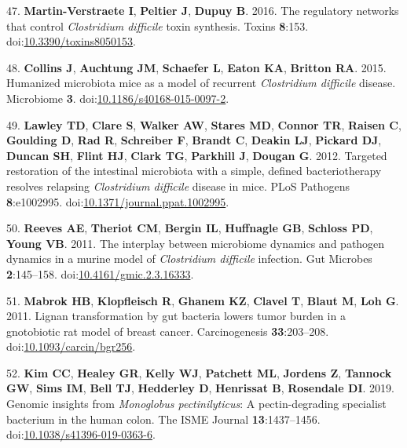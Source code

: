 \documentclass[
  12pt,
]{article}
\newenvironment{cslreferences}%
  {}%
  {\par}
\begin{document}
\begin{cslreferences}
\leavevmode\hypertarget{ref-MartinVerstraete2016}{}%
47. \textbf{Martin-Verstraete I}, \textbf{Peltier J}, \textbf{Dupuy B}.
2016. The regulatory networks that control \emph{Clostridium difficile}
toxin synthesis. Toxins \textbf{8}:153.
doi:\href{https://doi.org/10.3390/toxins8050153}{10.3390/toxins8050153}.

\leavevmode\hypertarget{ref-Collins2015}{}%
48. \textbf{Collins J}, \textbf{Auchtung JM}, \textbf{Schaefer L},
\textbf{Eaton KA}, \textbf{Britton RA}. 2015. Humanized microbiota mice
as a model of recurrent \emph{Clostridium difficile} disease. Microbiome
\textbf{3}.
doi:\href{https://doi.org/10.1186/s40168-015-0097-2}{10.1186/s40168-015-0097-2}.

\leavevmode\hypertarget{ref-Lawley2012}{}%
49. \textbf{Lawley TD}, \textbf{Clare S}, \textbf{Walker AW},
\textbf{Stares MD}, \textbf{Connor TR}, \textbf{Raisen C},
\textbf{Goulding D}, \textbf{Rad R}, \textbf{Schreiber F},
\textbf{Brandt C}, \textbf{Deakin LJ}, \textbf{Pickard DJ},
\textbf{Duncan SH}, \textbf{Flint HJ}, \textbf{Clark TG},
\textbf{Parkhill J}, \textbf{Dougan G}. 2012. Targeted restoration of
the intestinal microbiota with a simple, defined bacteriotherapy
resolves relapsing \emph{Clostridium difficile} disease in mice. PLoS
Pathogens \textbf{8}:e1002995.
doi:\href{https://doi.org/10.1371/journal.ppat.1002995}{10.1371/journal.ppat.1002995}.

\leavevmode\hypertarget{ref-Reeves2011}{}%
50. \textbf{Reeves AE}, \textbf{Theriot CM}, \textbf{Bergin IL},
\textbf{Huffnagle GB}, \textbf{Schloss PD}, \textbf{Young VB}. 2011. The
interplay between microbiome dynamics and pathogen dynamics in a murine
model of \emph{Clostridium difficile} infection. Gut Microbes
\textbf{2}:145--158.
doi:\href{https://doi.org/10.4161/gmic.2.3.16333}{10.4161/gmic.2.3.16333}.

\leavevmode\hypertarget{ref-Mabrok2011}{}%
51. \textbf{Mabrok HB}, \textbf{Klopfleisch R}, \textbf{Ghanem KZ},
\textbf{Clavel T}, \textbf{Blaut M}, \textbf{Loh G}. 2011. Lignan
transformation by gut bacteria lowers tumor burden in a gnotobiotic rat
model of breast cancer. Carcinogenesis \textbf{33}:203--208.
doi:\href{https://doi.org/10.1093/carcin/bgr256}{10.1093/carcin/bgr256}.

\leavevmode\hypertarget{ref-Kim2019}{}%
52. \textbf{Kim CC}, \textbf{Healey GR}, \textbf{Kelly WJ},
\textbf{Patchett ML}, \textbf{Jordens Z}, \textbf{Tannock GW},
\textbf{Sims IM}, \textbf{Bell TJ}, \textbf{Hedderley D},
\textbf{Henrissat B}, \textbf{Rosendale DI}. 2019. Genomic insights from
\emph{Monoglobus pectinilyticus}: A pectin-degrading specialist
bacterium in the human colon. The ISME Journal \textbf{13}:1437--1456.
doi:\href{https://doi.org/10.1038/s41396-019-0363-6}{10.1038/s41396-019-0363-6}.


\end{cslreferences}
\end{document}

